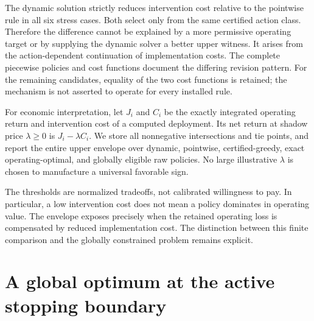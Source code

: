 The dynamic solution strictly reduces intervention cost relative to the pointwise rule in all six stress cases. Both select only from the same certified action class. Therefore the difference cannot be explained by a more permissive operating target or by supplying the dynamic solver a better upper witness. It arises from the action-dependent continuation of implementation costs. The complete piecewise policies and cost functions document the differing revision pattern. For the remaining candidates, equality of the two cost functions is retained; the mechanism is not asserted to operate for every installed rule.

For economic interpretation, let $J_i$ and $C_i$ be the exactly integrated operating return and intervention cost of a computed deployment. Its net return at shadow price $\lambda\ge0$ is $J_i-\lambda C_i$. We store all nonnegative intersections and tie points, and report the entire upper envelope over dynamic, pointwise, certified-greedy, exact operating-optimal, and globally eligible raw policies. No large illustrative $\lambda$ is chosen to manufacture a universal favorable sign.

The thresholds are normalized tradeoffs, not calibrated willingness to pay. In particular, a low intervention cost does not mean a policy dominates in operating value. The envelope exposes precisely when the retained operating loss is compensated by reduced implementation cost. The distinction between this finite comparison and the globally constrained problem remains explicit.

\section{A global optimum at the active stopping boundary}\label{sec:stopped}
